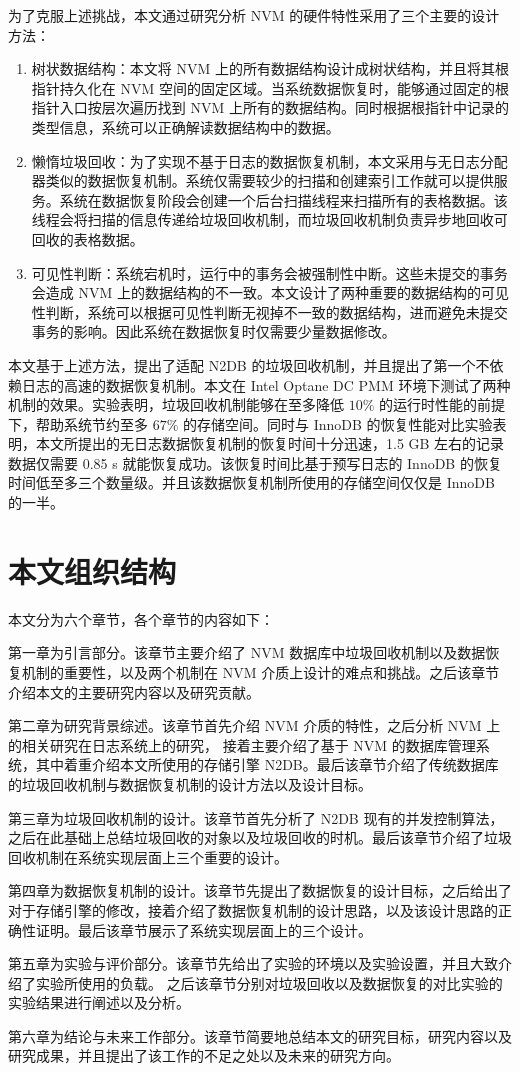 为了克服上述挑战，本文通过研究分析 NVM 的硬件特性采用了三个主要的设计方法：

\begin{enumerate}
    \item 树状数据结构：本文将 NVM 上的所有数据结构设计成树状结构，并且将其根指针持久化在 NVM 空间的固定区域。当系统数据恢复时，能够通过固定的根指针入口按层次遍历找到 NVM 上所有的数据结构。同时根据根指针中记录的类型信息，系统可以正确解读数据结构中的数据。
    \item 懒惰垃圾回收：为了实现不基于日志的数据恢复机制，本文采用与无日志分配器类似的数据恢复机制。系统仅需要较少的扫描和创建索引工作就可以提供服务。系统在数据恢复阶段会创建一个后台扫描线程来扫描所有的表格数据。该线程会将扫描的信息传递给垃圾回收机制，而垃圾回收机制负责异步地回收可回收的表格数据。
    \item 可见性判断：系统宕机时，运行中的事务会被强制性中断。这些未提交的事务会造成 NVM 上的数据结构的不一致。本文设计了两种重要的数据结构的可见性判断，系统可以根据可见性判断无视掉不一致的数据结构，进而避免未提交事务的影响。因此系统在数据恢复时仅需要少量数据修改。
\end{enumerate}

本文基于上述方法，提出了适配 N2DB 的垃圾回收机制，并且提出了第一个不依赖日志的高速的数据恢复机制。本文在 Intel Optane DC PMM 环境下测试了两种机制的效果。实验表明，垃圾回收机制能够在至多降低 $10\%$ 的运行时性能的前提下，帮助系统节约至多 $67\%$ 的存储空间。同时与 InnoDB 的恢复性能对比实验表明，本文所提出的无日志数据恢复机制的恢复时间十分迅速，1.5 GB 左右的记录数据仅需要 0.85 s 就能恢复成功。该恢复时间比基于预写日志的 InnoDB 的恢复时间低至多三个数量级。并且该数据恢复机制所使用的存储空间仅仅是 InnoDB 的一半。

\section{本文组织结构}

本文分为六个章节，各个章节的内容如下：

第一章为引言部分。该章节主要介绍了 NVM 数据库中垃圾回收机制以及数据恢复机制的重要性，以及两个机制在 NVM 介质上设计的难点和挑战。之后该章节介绍本文的主要研究内容以及研究贡献。

第二章为研究背景综述。该章节首先介绍 NVM 介质的特性，之后分析 NVM 上的相关研究在日志系统上的研究，
接着主要介绍了基于 NVM 的数据库管理系统，其中着重介绍本文所使用的存储引擎 N2DB。最后该章节介绍了传统数据库的垃圾回收机制与数据恢复机制的设计方法以及设计目标。

第三章为垃圾回收机制的设计。该章节首先分析了 N2DB 现有的并发控制算法，之后在此基础上总结垃圾回收的对象以及垃圾回收的时机。最后该章节介绍了垃圾回收机制在系统实现层面上三个重要的设计。

第四章为数据恢复机制的设计。该章节先提出了数据恢复的设计目标，之后给出了对于存储引擎的修改，接着介绍了数据恢复机制的设计思路，以及该设计思路的正确性证明。最后该章节展示了系统实现层面上的三个设计。

第五章为实验与评价部分。该章节先给出了实验的环境以及实验设置，并且大致介绍了实验所使用的负载。
之后该章节分别对垃圾回收以及数据恢复的对比实验的实验结果进行阐述以及分析。

第六章为结论与未来工作部分。该章节简要地总结本文的研究目标，研究内容以及研究成果，并且提出了该工作的不足之处以及未来的研究方向。


